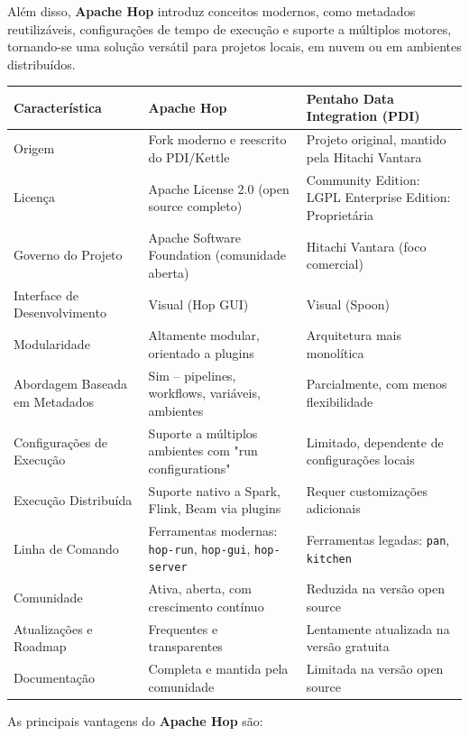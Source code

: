 \documentclass[a4paper,11pt]{article}
\begin{document}
Além disso, \textbf{Apache Hop} introduz conceitos modernos, como metadados reutilizáveis, configurações de tempo de execução e suporte a múltiplos motores, tornando-se uma solução versátil para projetos locais, em nuvem ou em ambientes distribuídos.

{
\captionsetup{labelformat=empty}
\begin{longtable}{@{}p{3.5cm}p{5cm}p{5cm}@{}}
	\toprule
	\textbf{Característica} & \textbf{Apache Hop} & \textbf{Pentaho Data Integration (PDI)} \\
	\midrule
	Origem & Fork moderno e reescrito do PDI/Kettle & Projeto original, mantido pela Hitachi Vantara \\
	Licença & Apache License 2.0 (open source completo) & Community Edition: LGPL \newline Enterprise Edition: Proprietária \\
	Governo do Projeto & Apache Software Foundation (comunidade aberta) & Hitachi Vantara (foco comercial) \\
	Interface de Desenvolvimento & Visual (Hop GUI) & Visual (Spoon) \\
	Modularidade & Altamente modular, orientado a plugins & Arquitetura mais monolítica \\
	Abordagem Baseada em Metadados & Sim – pipelines, workflows, variáveis, ambientes & Parcialmente, com menos flexibilidade \\
	Configurações de Execução & Suporte a múltiplos ambientes com "run configurations" & Limitado, dependente de configurações locais \\
	Execução Distribuída & Suporte nativo a Spark, Flink, Beam via plugins & Requer customizações adicionais \\
	Linha de Comando & Ferramentas modernas: \texttt{hop-run}, \texttt{hop-gui}, \texttt{hop-server} & Ferramentas legadas: \texttt{pan}, \texttt{kitchen} \\
	Comunidade & Ativa, aberta, com crescimento contínuo & Reduzida na versão open source \\
	Atualizações e Roadmap & Frequentes e transparentes & Lentamente atualizada na versão gratuita \\
	Documentação & Completa e mantida pela comunidade & Limitada na versão open source \\
	\bottomrule
\end{longtable}
}

As principais vantagens do \textbf{Apache Hop} são:
\end{document}
